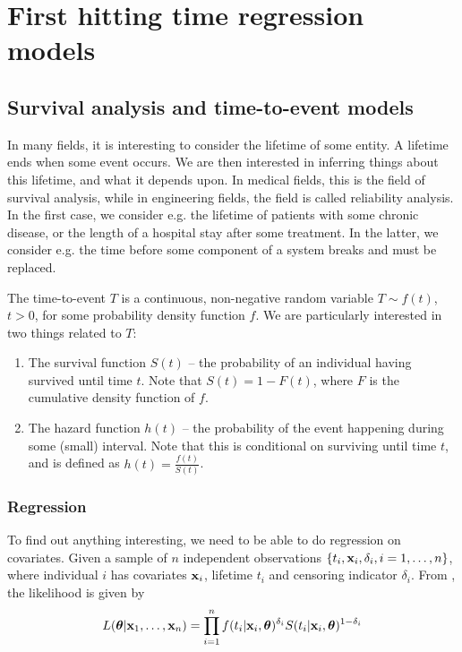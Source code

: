 \chapter{First hitting time regression models}

\section{Survival analysis and time-to-event models}\label{sec:survival}
In many fields, it is interesting to consider the lifetime of some entity. A lifetime ends when some event occurs. We are then interested in inferring things about this lifetime, and what it depends upon. In medical fields, this is the field of survival analysis, while in engineering fields, the field is called reliability analysis. In the first case, we consider e.g. the lifetime of patients with some chronic disease, or the length of a hospital stay after some treatment. In the latter, we consider e.g. the time before some component of a system breaks and must be replaced.

The time-to-event $T$ is a continuous, non-negative random variable $T\sim f(t)$, $t>0$, for some probability density function $f$. We are particularly interested in two things related to $T$:
\begin{enumerate}
\item{}The survival function $S(t)$ -- the probability of an individual having survived until time $t$. Note that $S(t)=1-F(t)$, where $F$ is the cumulative density function of $f$.
\item{}The hazard function $h(t)$ -- the probability of the event happening during some (small) interval. Note that this is conditional on surviving until time $t$, and is defined as $h(t)=\frac{f(t)}{S(t)}$.
\end{enumerate}

\subsection{Regression}\label{sec:surv-reg}
To find out anything interesting, we need to be able to do regression on covariates. Given a sample of $n$ independent observations $\{t_i,\mathbf{x}_i, \delta_i,i=1,\ldots,n\}$, where individual $i$ has covariates $\mathbf{x}_i$, lifetime $t_i$ and censoring indicator $\delta_i$. From \cite[10]{caroni2017}, the likelihood is given by
\begin{equation}\label{eq:surv-lik}
    L(\boldsymbol{\theta}|\mathbf{x}_1,\ldots,\mathbf{x}_n)=\prod_{i=1}^n f(t_i|\mathbf{x}_i,\boldsymbol{\theta})^{\delta_i} S(t_i|\mathbf{x}_i,\boldsymbol{\theta})^{1-\delta_i}
\end{equation}

